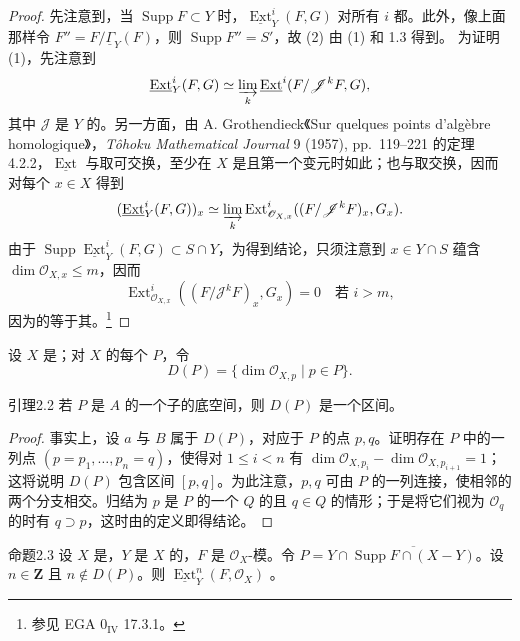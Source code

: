 \begin{proof}
先注意到，当 $\operatorname{Supp}F\subset Y$ 时，$\underline{\operatorname{Ext}}^i_Y(F,G)$ 对所有 $i$ 都。此外，像上面那样令 $F''=F/\underline\Gamma_Y(F)$，则 $\operatorname{Supp}F''=S'$，故 (2) 由 (1) 和 1.3 得到。
为证明 (1)，先注意到
\[\underline{\operatorname{Ext}}^i_Y(F,G)\simeq\varinjlim_k\underline{\operatorname{Ext}}^i(F/\mathscr J^kF,G),\]
其中 $\mathscr J$ 是 $Y$ 的。另一方面，由 A. Grothendieck《Sur quelques points d'algèbre homologique》，\emph{Tôhoku Mathematical Journal} 9 (1957), pp.~119--221 的定理 4.2.2，$\underline{\operatorname{Ext}}$ 与取可交换，至少在 $X$ 是且第一个变元时如此；也与取交换，因而对每个 $x\in X$ 得到
\[(\underline{\operatorname{Ext}}^i_Y(F,G))_x\simeq\varinjlim_k\operatorname{Ext}^i_{\mathscr O_{X,x}}((F/\mathscr J^kF)_x,G_x).\]
由于 $\operatorname{Supp}\underline{\operatorname{Ext}}^i_Y(F,G)\subset S\cap Y$，为得到结论，只须注意到 $x\in Y\cap S$ 蕴含 $\dim\mathscr O_{X,x}\leq m$，因而
\[\operatorname{Ext}^i_{\mathscr O_{X,x}}((F/\mathscr J^kF)_x,G_x)=0\quad\text{若 }i>m,\]
因为的等于其。\footnote{参见 EGA $0_{\mathrm{IV}}$ 17.3.1。}
\end{proof}
设 $X$ 是；对 $X$ 的每个 $P$，令
\[D(P)=\{\dim\mathscr O_{X,p}\mid p\in P\}.\]
\begin{SGAresult}{引理}{2.2}
若 $P$ 是 $A$ 的一个子的底空间，则 $D(P)$ 是一个区间。
\end{SGAresult}
\begin{proof}
事实上，设 $a$ 与 $B$ 属于 $D(P)$，对应于 $P$ 的点 $p,q$。证明存在 $P$ 中的一列点 $(p=p_1,\ldots,p_n=q)$，使得对 $1\leq i<n$ 有 $\dim\mathscr O_{X,p_i}-\dim\mathscr O_{X,p_{i+1}}=1$；这将说明 $D(P)$ 包含区间 $[p,q]$。为此注意，$p,q$ 可由 $P$ 的一列连接，使相邻的两个分支相交。归结为 $p$ 是 $P$ 的一个 $Q$ 的且 $q\in Q$ 的情形；于是将它们视为 $\mathscr O_q$ 的时有 $q\supset p$，这时由的定义即得结论。
\end{proof}
\begin{SGAresult}{命题}{2.3}
设 $X$ 是，$Y$ 是 $X$ 的，$F$ 是 $\mathscr O_X$-模。令 $P=Y\cap\overline{\operatorname{Supp}F\cap(X-Y)}$。设 $n\in\mathbf Z$ 且 $n\notin D(P)$。则 $\underline{\operatorname{Ext}}^n_Y(F,\mathscr O_X)$ 。
\end{SGAresult}
